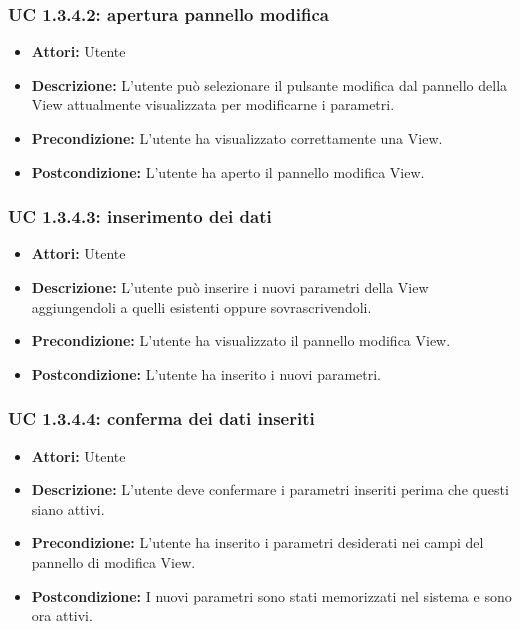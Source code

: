 \subsubsection{UC 1.3.4.2: apertura pannello modifica}

\begin{itemize}
\item \textbf{Attori:} Utente
\item \textbf{Descrizione:} L'utente può selezionare il pulsante modifica dal pannello della View attualmente visualizzata per modificarne i parametri.
\item \textbf{Precondizione:} L'utente ha visualizzato correttamente una View.
\item \textbf{Postcondizione:} L'utente ha aperto il pannello modifica View.
\end{itemize}

\subsubsection{UC 1.3.4.3: inserimento dei dati}

\begin{itemize}
\item \textbf{Attori:} Utente
\item \textbf{Descrizione:} L'utente può inserire i nuovi parametri della View aggiungendoli a quelli esistenti oppure sovrascrivendoli.
\item \textbf{Precondizione:} L'utente ha visualizzato il pannello modifica View.
\item \textbf{Postcondizione:} L'utente ha inserito i nuovi parametri.
\end{itemize}

\subsubsection{UC 1.3.4.4: conferma dei dati inseriti}

\begin{itemize}
\item \textbf{Attori:} Utente
\item \textbf{Descrizione:} L'utente deve confermare i parametri inseriti perima che questi siano attivi.
\item \textbf{Precondizione:} L'utente ha inserito i parametri desiderati nei campi del pannello di modifica View.
\item \textbf{Postcondizione:} I nuovi parametri sono stati memorizzati nel sistema e sono ora attivi.
\end{itemize}

